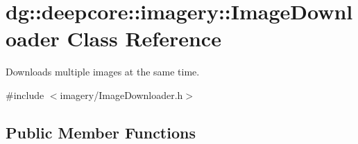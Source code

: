 \hypertarget{classdg_1_1deepcore_1_1imagery_1_1_image_downloader}{}\section{dg\+:\+:deepcore\+:\+:imagery\+:\+:Image\+Downloader Class Reference}
\label{classdg_1_1deepcore_1_1imagery_1_1_image_downloader}


Downloads multiple images at the same time.  




{\ttfamily \#include $<$imagery/\+Image\+Downloader.\+h$>$}

\subsection*{Public Member Functions}
